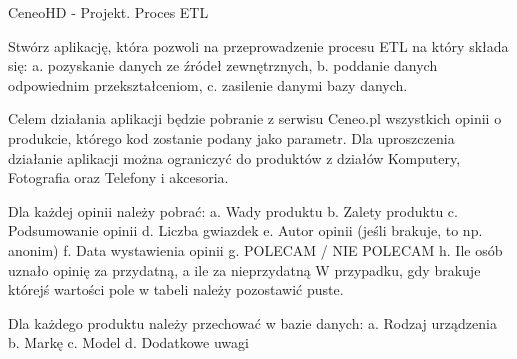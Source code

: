 Ceneo\+HD -\/ Projekt. Proces E\+TL


\begin{DoxyEnumerate}
\item Stwórz aplikację, która pozwoli na przeprowadzenie procesu E\+TL na który składa się\+: a. pozyskanie danych ze źródeł zewnętrznych, b. poddanie danych odpowiednim przekształceniom, c. zasilenie danymi bazy danych.
\item Celem działania aplikacji będzie pobranie z serwisu Ceneo.\+pl wszystkich opinii o produkcie, którego kod zostanie podany jako parametr. Dla uproszczenia działanie aplikacji można ograniczyć do produktów z działów Komputery, Fotografia oraz Telefony i akcesoria.
\item Dla każdej opinii należy pobrać\+: a. Wady produktu b. Zalety produktu c. Podsumowanie opinii d. Liczba gwiazdek e. Autor opinii (jeśli brakuje, to np. anonim) f. Data wystawienia opinii g. P\+O\+L\+E\+C\+AM / N\+IE P\+O\+L\+E\+C\+AM h. Ile osób uznało opinię za przydatną, a ile za nieprzydatną W przypadku, gdy brakuje którejś wartości pole w tabeli należy pozostawić puste.
\item Dla każdego produktu należy przechować w bazie danych\+: a. Rodzaj urządzenia b. Markę c. Model d. Dodatkowe uwagi
\end{DoxyEnumerate}
